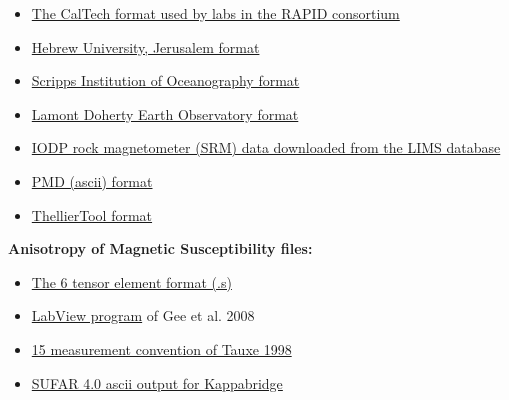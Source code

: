 \documentclass[11pt]{book}
\begin{document}
{{\begin{itemize}
\item \href{#cit_magic.py}{The CalTech format used by labs in the RAPID consortium}
\item \href{#huji_magic.py}{Hebrew University, Jerusalem format}
\item \href{#sio_magic.py}{Scripps Institution of Oceanography format}
\item \href{#ldeo_magic.py}{Lamont Doherty Earth Observatory format}
\item \href{#iodp_csv_magic.py}{IODP rock magnetometer (SRM) data downloaded from the LIMS database}
\item \href{#pmd_magic.py}{PMD (ascii) format}
\item \href{#tdt_magic.py}{ThellierTool format}
\end{itemize}


{\bf Anisotropy of Magnetic Susceptibility files:}

\begin{itemize}
\item \href{#s_magic.py}{The 6 tensor element format (.s)}
\item \href{#KLY4S_magic.py}{LabView program} of Gee et al. 2008 \nocite{gee08}
\item \href{#k15\_magic.py}{15 measurement convention of Tauxe 1998 \nocite{tauxe98}}
\item \href{#SUFAR4-asc\_magic.py}{SUFAR 4.0 ascii output for Kappabridge}
\end{itemize}

}}
\end{document}
